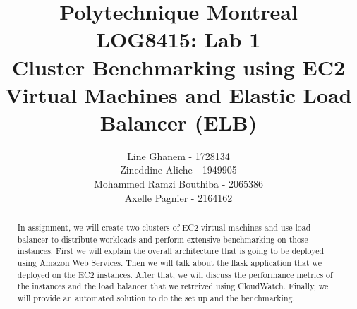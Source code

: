 \documentclass[12pt]{article}
\title{Polytechnique Montreal \\
LOG8415: Lab 1\\
Cluster Benchmarking using EC2 Virtual
Machines and Elastic Load Balancer (ELB)}
\author{Line Ghanem - 1728134\\Zineddine Aliche - 1949905\\
Mohammed Ramzi Bouthiba - 2065386\\Axelle Pagnier - 2164162}
\begin{document}
\maketitle

\begin{abstract}
In	assignment,	we	will	create	two	clusters of	EC2 virtual	machines and use	load	balancer	to	distribute	workloads	and	perform	extensive	benchmarking	on	those instances.\newline
First we will explain the overall architecture that is going to be deployed using Amazon Web Services. Then we will talk about the flask application that we deployed on the EC2 instances. After that, we will discuss the performance metrics of the instances and the load balancer that we retreived using CloudWatch.	Finally, we will provide an automated solution to do the set up and the benchmarking.
\end{abstract}
\end{document}
